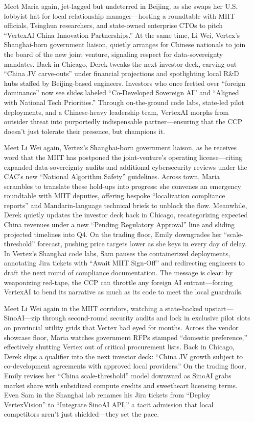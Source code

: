 Meet Maria again, jet-lagged but undeterred in Beijing, as she swaps her U.S. lobbyist hat for local relationship 
manager—hosting a roundtable with MIIT officials, Tsinghua researchers, and state-owned enterprise CTOs to pitch 
“VertexAI China Innovation Partnerships.” At the same time, Li Wei, Vertex’s Shanghai-born government liaison, 
quietly arranges for Chinese nationals to join the board of the new joint venture, signaling respect for 
data-sovereignty mandates. Back in Chicago, Derek tweaks the next investor deck, carving out “China JV carve-outs” 
under financial projections and spotlighting local R\&D hubs staffed by Beijing-based engineers. Investors who once 
fretted over “foreign dominance” now see slides labeled “Co-Developed Sovereign AI” and “Aligned with National 
Tech Priorities.” Through on-the-ground code labs, state-led pilot deployments, and a Chinese-heavy leadership team,
 VertexAI morphs from outsider threat into purportedly indispensable partner—ensuring that the CCP doesn’t just 
 tolerate their presence, but champions it.

Meet Li Wei again, Vertex’s Shanghai-born government liaison, as he receives word that the MIIT has postponed 
the joint-venture’s operating license—citing expanded data-sovereignty audits and additional cybersecurity reviews 
under the CAC’s new “National Algorithm Safety” guidelines. Across town, Maria scrambles to translate these hold-ups 
into progress: she convenes an emergency roundtable with MIIT deputies, offering bespoke “localization compliance 
reports” and Mandarin-language technical briefs to unblock the flow. Meanwhile, Derek quietly updates the investor 
deck back in Chicago, recategorizing expected China revenues under a new “Pending Regulatory Approval” line and 
sliding projected timelines into Q4. On the trading floor, Emily downgrades her “scale-threshold” forecast, pushing 
price targets lower as she keys in every day of delay. In Vertex’s Shanghai code labs, Sam pauses the containerized 
deployments, annotating Jira tickets with “Await MIIT Sign-Off” and redirecting engineers to draft the next round 
of compliance documentation. The message is clear: by weaponizing red-tape, the CCP can throttle any foreign AI 
entrant—forcing VertexAI to bend its narrative as much as its code to meet the local guardrails.

Meet Li Wei again in the MIIT corridors, watching a state-backed upstart—SinoAI—zip through second-round security 
audits and lock in exclusive pilot slots on provincial utility grids that Vertex had eyed for months. Across the 
vendor showcase floor, Maria watches government RFPs stamped “domestic preference,” effectively shutting Vertex 
out of critical procurement lists. Back in Chicago, Derek slips a qualifier into the next investor deck: “China 
JV growth subject to co-development agreements with approved local providers.” On the trading floor, Emily revises 
her “China scale-threshold” model downward as SinoAI grabs market share with subsidized compute credits and 
sweetheart licensing terms. Even Sam in the Shanghai lab renames his Jira tickets from “Deploy VertexVision” to 
“Integrate SinoAI API,” a tacit admission that local competitors aren’t just shielded—they set the pace.

